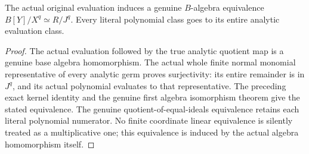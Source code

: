 \begin{theorem}
\label{hir:relative-normal-polynomial-jets-entire-algebra-equivalence}
\leanok
{}
The actual original evaluation induces a genuine $B$-algebra equivalence $B[Y]/X^q \simeq R/J^q$. Every literal polynomial class goes to its entire analytic evaluation class.
\end{theorem}
\begin{proof}
The actual evaluation followed by the true analytic quotient map is a genuine base algebra homomorphism. The actual whole finite normal monomial representative of every analytic germ proves surjectivity: its entire remainder is in $J^q$, and its actual polynomial evaluates to that representative. The preceding exact kernel identity and the genuine first algebra isomorphism theorem give the stated equivalence. The genuine quotient-of-equal-ideals equivalence retains each literal polynomial numerator. No finite coordinate linear equivalence is silently treated as a multiplicative one; this equivalence is induced by the actual algebra homomorphism itself.
\end{proof}

